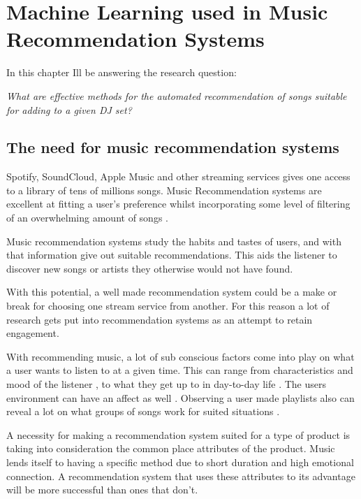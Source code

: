 
\graphicspath{{Chapter2/}}

\chapter{Machine Learning used in Music Recommendation Systems}

In this chapter Ill be answering the research question:

\textit{What are effective methods for the automated recommendation of songs suitable for adding to a given DJ set?} 

\section{The need for music recommendation systems}
Spotify, SoundCloud, Apple Music and other streaming services gives one access to a library of tens of millions songs. Music Recommendation systems are excellent at fitting a user's preference whilst incorporating some level of filtering of an overwhelming amount of songs \citep{bollen_understanding_2010}. 

Music recommendation systems study the habits and tastes of users, and with that information give out suitable recommendations. This aids the listener to discover new songs or artists they otherwise would not have found.

With this potential, a well made recommendation system could be a make or break for choosing one stream service from another. For this reason a lot of research gets put into recommendation systems as an attempt to retain engagement. 

 With recommending music, a lot of sub conscious factors come into play on what a user wants to listen to at a given time. This can range from characteristics and mood of the listener \citep{ferwerda_personality_2015}  \citep{rentfrow_re_2003}, to what they get up to in day-to-day life \citep{gillhofer_iron_2015} \citep{wang_context-aware_2012}.  The users environment can have an affect as well \citep{kaminskas_location-aware_2013}. Observing a user made playlists also can reveal a lot on what groups of songs work for suited situations \citep{zheleva_statistical_2010} \citep{mcfee_hypergraph_2012}.
 
 A necessity for making a recommendation system suited for a type of product is taking into consideration the common place attributes of the product. Music lends itself to having a specific method due to short duration and high emotional connection. A recommendation system that uses these attributes to its advantage will be more successful than ones that don't.

